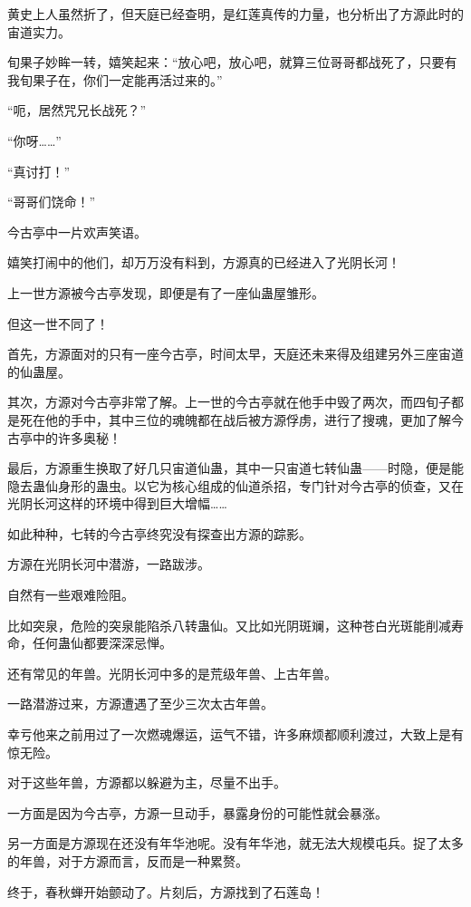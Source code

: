 \begin{this_body}
黄史上人虽然折了，但天庭已经查明，是红莲真传的力量，也分析出了方源此时的宙道实力。

旬果子妙眸一转，嬉笑起来：“放心吧，放心吧，就算三位哥哥都战死了，只要有我旬果子在，你们一定能再活过来的。”

“呃，居然咒兄长战死？”

“你呀……”

“真讨打！”

“哥哥们饶命！”

今古亭中一片欢声笑语。

嬉笑打闹中的他们，却万万没有料到，方源真的已经进入了光阴长河！

上一世方源被今古亭发现，即便是有了一座仙蛊屋雏形。

但这一世不同了！

首先，方源面对的只有一座今古亭，时间太早，天庭还未来得及组建另外三座宙道的仙蛊屋。

其次，方源对今古亭非常了解。上一世的今古亭就在他手中毁了两次，而四旬子都是死在他的手中，其中三位的魂魄都在战后被方源俘虏，进行了搜魂，更加了解今古亭中的许多奥秘！

最后，方源重生换取了好几只宙道仙蛊，其中一只宙道七转仙蛊——时隐，便是能隐去蛊仙身形的蛊虫。以它为核心组成的仙道杀招，专门针对今古亭的侦查，又在光阴长河这样的环境中得到巨大增幅……

如此种种，七转的今古亭终究没有探查出方源的踪影。

方源在光阴长河中潜游，一路跋涉。

自然有一些艰难险阻。

比如突泉，危险的突泉能陷杀八转蛊仙。又比如光阴斑斓，这种苍白光斑能削减寿命，任何蛊仙都要深深忌惮。

还有常见的年兽。光阴长河中多的是荒级年兽、上古年兽。

一路潜游过来，方源遭遇了至少三次太古年兽。

幸亏他来之前用过了一次燃魂爆运，运气不错，许多麻烦都顺利渡过，大致上是有惊无险。

对于这些年兽，方源都以躲避为主，尽量不出手。

一方面是因为今古亭，方源一旦动手，暴露身份的可能性就会暴涨。

另一方面是方源现在还没有年华池呢。没有年华池，就无法大规模屯兵。捉了太多的年兽，对于方源而言，反而是一种累赘。

终于，春秋蝉开始颤动了。片刻后，方源找到了石莲岛！

\end{this_body}

